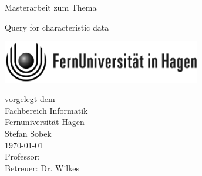 \begin{titlepage}
\vspace{4em}
\center
 \Large{\textsf{Masterarbeit zum Thema}}
 \vspace{1em}

\Huge{\textsf{Query for characteristic data}}
\vspace{1em}
\\
\begin{center}
	\includegraphics[width=0.65\textwidth]{images/feulogo.pdf}
\end{center}

\vspace{1em}
\Large{
\textsf{
vorgelegt dem\\
Fachbereich Informatik\\Fernuniversität Hagen
}
}
\vspace{2em}
\\
\Large{
\textsf{
Stefan Sobek\\
\today
\vspace{2em}
\\
Professor: \\
Betreuer: Dr. Wilkes
}
}
\end{titlepage}